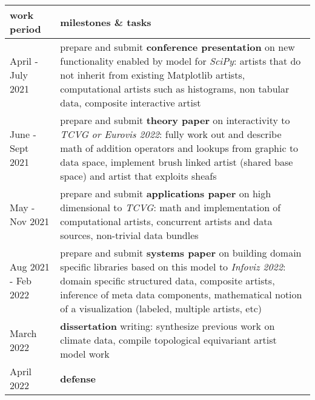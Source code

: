 \documentclass[../main.tex]{subfiles}
\begin{document}
\begin{table}[H]
    \centering
    \renewcommand{\arraystretch}{2}
    \begin{tabularx}{\textwidth}{|l|X|}\hline
    \textbf{work period} & \textbf{milestones \& tasks} \\ \hline
    April - July 2021  & prepare and submit \textbf{conference presentation} on new functionality enabled by model for \textit{SciPy}: \newline artists that do not inherit from existing Matplotlib artists, computational artists such as histograms, non tabular data, composite interactive artist \\ \hline
    June - Sept 2021  & prepare and submit \textbf{theory paper} on interactivity to \textit{TCVG or Eurovis 2022}: \newline fully work out and describe math of addition operators and lookups from graphic to data space, implement brush linked artist (shared base space) and artist that exploits sheafs \\ \hline
    May - Nov 2021 & prepare and submit \textbf{applications paper} on high dimensional to \textit{TCVG}: \newline math and implementation of computational artists, concurrent artists and data sources, non-trivial data bundles \\ \hline 
    Aug 2021 - Feb 2022 & prepare and submit \textbf{systems paper} on building domain specific libraries based on this model to \textit{Infoviz 2022}: \newline domain specific structured data, composite artists, inference of meta data components, mathematical notion of a visualization (labeled, multiple artists, etc)\\ \hline
    March 2022 & \textbf{dissertation} writing: \newline synthesize previous work on climate data, compile topological equivariant artist model work \\ \hline
    April 2022 & \textbf{defense} \\ \hline
    \end{tabularx}
    \caption{}
    \label{tab:code:schedule}
\end{table}
\end{document}
